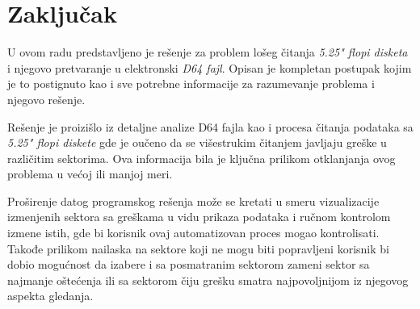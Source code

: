\section{Zaključak}

U ovom radu predstavljeno je rešenje za problem lošeg čitanja \textit{5.25" flopi disketa} i njegovo pretvaranje u elektronski \textit{D64 fajl}. Opisan je kompletan postupak kojim je to postignuto kao i sve potrebne informacije za razumevanje problema i njegovo rešenje.

Rešenje je proizišlo iz detaljne analize D64 fajla kao i procesa čitanja podataka sa \textit{5.25" flopi diskete} gde je oučeno da se višestrukim čitanjem javljaju greške u različitim sektorima. Ova informacija bila je ključna prilikom otklanjanja ovog problema u većoj ili manjoj meri.

Proširenje datog programskog rešenja može se kretati u smeru vizualizacije izmenjenih sektora sa greškama u vidu prikaza podataka i ručnom kontrolom izmene istih, gde bi korisnik ovaj automatizovan proces mogao kontrolisati. Takođe prilikom nailaska na sektore koji ne mogu biti popravljeni korisnik bi dobio mogućnost da izabere i sa posmatranim sektorom zameni sektor sa najmanje oštećenja ili sa sektorom čiju grešku smatra najpovoljnijom iz njegovog aspekta gledanja.
